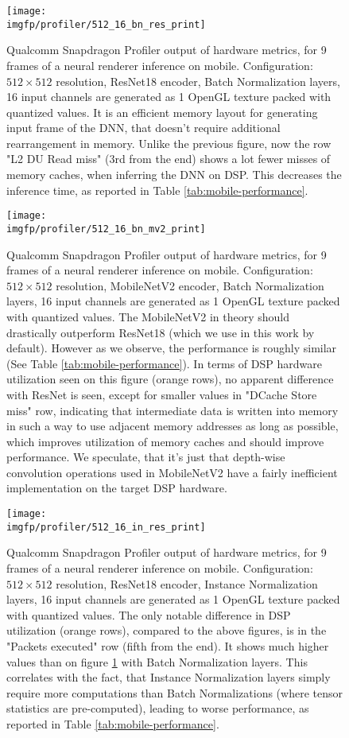 \begin{figure}
	\centering
	\texttt{[image: \\imgfp/profiler/512\_16\_bn\_res\_print]}
	\caption{Qualcomm Snapdragon Profiler output of hardware metrics, for 9 frames of a neural renderer inference on mobile. Configuration: $512\times512$ resolution, ResNet18 encoder, Batch Normalization layers, 16 input channels are generated as 1 OpenGL texture packed with quantized values. It is an efficient memory layout for generating input frame of the DNN, that doesn't require additional rearrangement in memory. Unlike the previous figure, now the row "L2 DU Read miss" (3rd from the end) shows a lot fewer misses of memory caches, when inferring the DNN on DSP. This decreases the inference time, as reported in Table \ref{tab:mobile-performance}.}
	\label{fig:profiler_16_bn_res}
\end{figure}

\begin{figure}
	\centering
	\texttt{[image: \\imgfp/profiler/512\_16\_bn\_mv2\_print]}
	\caption{Qualcomm Snapdragon Profiler output of hardware metrics, for 9 frames of a neural renderer inference on mobile. Configuration: $512\times512$ resolution, MobileNetV2 encoder, Batch Normalization layers, 16 input channels are generated as 1 OpenGL texture packed with quantized values. The MobileNetV2 in theory should drastically outperform ResNet18 (which we use in this work by default). However as we observe, the performance is roughly similar (See Table \ref{tab:mobile-performance}). In terms of DSP hardware utilization seen on this figure (orange rows), no apparent difference with ResNet is seen, except for smaller values in "DCache Store miss" row, indicating that intermediate data is written into memory in such a way to use adjacent memory addresses as long as possible, which improves utilization of memory caches and should improve performance. We speculate, that it's just that depth-wise convolution operations used in MobileNetV2 have a fairly inefficient implementation on the target DSP hardware.}
	\label{fig:profiler_16_bn_mv2}
\end{figure}

\begin{figure}
	\centering
	\texttt{[image: \\imgfp/profiler/512\_16\_in\_res\_print]}
	\caption{Qualcomm Snapdragon Profiler output of hardware metrics, for 9 frames of a neural renderer inference on mobile. Configuration: $512\times512$ resolution, ResNet18 encoder, Instance Normalization layers, 16 input channels are generated as 1 OpenGL texture packed with quantized values. The only notable difference in DSP utilization (orange rows), compared to the above figures, is in the "Packets executed" row (fifth from the end). It shows much higher values than on figure \ref{fig:profiler_16_bn_res} with Batch Normalization layers. This correlates with the fact, that Instance Normalization layers simply require more computations than Batch Normalizations (where tensor statistics are pre-computed), leading to worse performance, as reported in Table \ref{tab:mobile-performance}.}
	\label{fig:profiler_16_in_res}
\end{figure}

